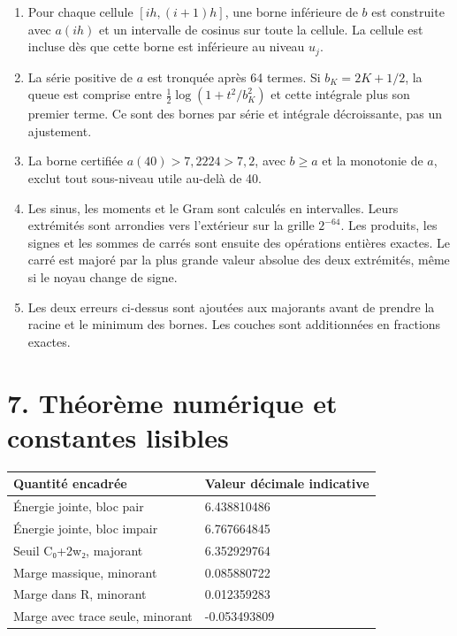 \documentclass[
  10pt,
  a4paper,
]{article}
\providecommand{\tightlist}{%
  \setlength{\itemsep}{0pt}\setlength{\parskip}{0pt}}
\begin{document}
\begin{enumerate}
\def\labelenumi{\arabic{enumi}.}
\tightlist
\item
  Pour chaque cellule \([ih,(i+1)h]\), une borne inférieure de \(b\) est
  construite avec \(a(ih)\) et un intervalle de cosinus sur toute la
  cellule. La cellule est incluse dès que cette borne est inférieure au
  niveau \(u_j\).
\item
  La série positive de \(a\) est tronquée après 64 termes. Si
  \(b_K=2K+1/2\), la queue est comprise entre
  \(\frac12\log(1+t^2/b_K^2)\) et cette intégrale plus son premier
  terme. Ce sont des bornes par série et intégrale décroissante, pas un
  ajustement.
\item
  La borne certifiée \(a(40)>7{,}2224>7{,}2\), avec \(b\ge a\) et la
  monotonie de \(a\), exclut tout sous-niveau utile au-delà de 40.
\item
  Les sinus, les moments et le Gram sont calculés en intervalles. Leurs
  extrémités sont arrondies vers l'extérieur sur la grille \(2^{-64}\).
  Les produits, les signes et les sommes de carrés sont ensuite des
  opérations entières exactes. Le carré est majoré par la plus grande
  valeur absolue des deux extrémités, même si le noyau change de signe.
\item
  Les deux erreurs ci-dessus sont ajoutées aux majorants avant de
  prendre la racine et le minimum des bornes. Les couches sont
  additionnées en fractions exactes.
\end{enumerate}

\hypertarget{thuxe9oruxe8me-numuxe9rique-et-constantes-lisibles}{%
\section{7. Théorème numérique et constantes
lisibles}\label{thuxe9oruxe8me-numuxe9rique-et-constantes-lisibles}}

\begin{longtable}[]{@{}ll@{}}
\toprule\noalign{}
Quantité encadrée & Valeur décimale indicative \\
\midrule\noalign{}
\endhead
\bottomrule\noalign{}
\endlastfoot
Énergie jointe, bloc pair & 6.438810486 \\
Énergie jointe, bloc impair & 6.767664845 \\
Seuil C₀+2w₂, majorant & 6.352929764 \\
Marge massique, minorant & 0.085880722 \\
Marge dans R, minorant & 0.012359283 \\
Marge avec trace seule, minorant & -0.053493809 \\
\end{longtable}
\end{document}
